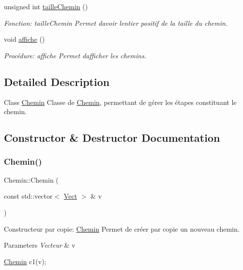 \begin{DoxyCompactItemize}
unsigned int \hyperlink{classChemin_a7153e040b29f294f30793a698cde23b3}{taille\+Chemin} ()
\begin{DoxyCompactList}\small\item\em Fonction\+: taille\+Chemin Permet d\textquotesingle{}avoir l\textquotesingle{}entier positif de la taille du chemin. \end{DoxyCompactList}\item 
void \hyperlink{classChemin_aca468327c0fc8ce57727bc13edfa741e}{affiche} ()
\begin{DoxyCompactList}\small\item\em Procédure\+: affiche Permet d\textquotesingle{}afficher les chemins. \end{DoxyCompactList}\end{DoxyCompactItemize}


\subsection{Detailed Description}
Class \hyperlink{classChemin}{Chemin} Classe de \hyperlink{classChemin}{Chemin}, permettant de gérer les étapes constituant le chemin. 

\subsection{Constructor \& Destructor Documentation}
\mbox{\label{classChemin_acbb44d2dd9c7eda79740c3ddb2b435c5}} 
\subsubsection{\texorpdfstring{Chemin()}{Chemin()}}
{\footnotesize\ttfamily Chemin\+::\+Chemin (\begin{DoxyParamCaption}\item[{const std\+::vector$<$ \hyperlink{classVect}{Vect} $>$ \&}]{v }\end{DoxyParamCaption})}



Constructeur par copie\+: \hyperlink{classChemin}{Chemin} Permet de créer par copie un nouveau chemin. 


\begin{DoxyParams}{Parameters}
{\em Vecteur} & v 
\begin{DoxyCode}
\hyperlink{classChemin}{Chemin} c1(v);
\end{DoxyCode}
 \\
\hline
\end{DoxyParams}


